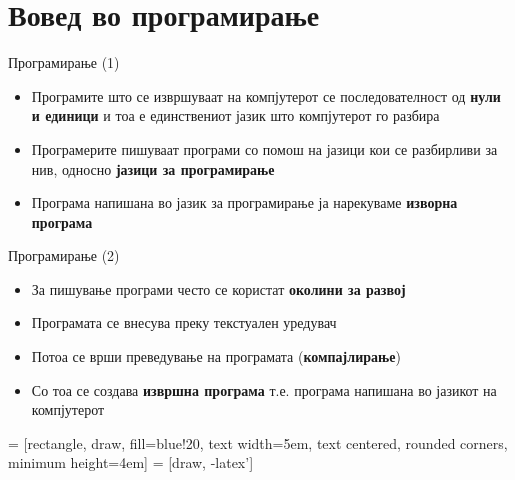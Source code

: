 \section{Вовед во програмирање}

\begin{frame}{Програмирање (1)}
\begin{itemize}
\item Програмите што се извршуваат на компјутерот се последователност од \textbf{нули и
единици} и тоа е единствениот јазик што компјутерот го разбира
\item Програмерите пишуваат програми  со помош на јазици кои се разбирливи за
нив, односно \textbf{јазици за програмирање} 
\item Програма напишана во јазик за програмирање ја нарекуваме \textbf{изворна програма}
\end{itemize}
\end{frame}

\begin{frame}{Програмирање (2)}
\begin{itemize}
  \item За пишување програми често се користат \textbf{околини за развој}
  \item Програмата се внесува преку текстуален уредувач
  \item Потоа се врши преведување на програмата (\textbf{компајлирање})
  \item Со тоа се создава \textbf{извршна програма} т.е. програма
напишана во јазикот на компјутерот
\end{itemize}
\end{frame}

 = [rectangle, draw, fill=blue!20,
text width=5em, text centered, rounded corners, minimum height=4em]
 = [draw, -latex']

